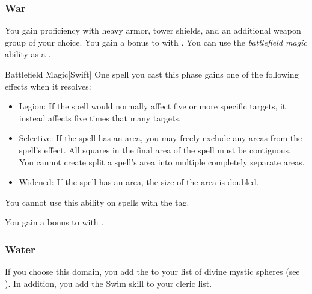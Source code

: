         \subsubsection{War}
             You gain proficiency with heavy armor, tower shields, and an additional weapon group of your choice.
             You gain a  bonus to  with .
             You can use the \textit{battlefield magic} ability as a .
            \begin{apability}{Battlefield Magic}[Swift]
                One spell you cast this phase gains one of the following effects when it resolves:
                \begin{itemize}
                    \item Legion: If the spell would normally affect five or more specific targets, it instead affects five times that many targets.
                    \item Selective: If the spell has an area, you may freely exclude any areas from the spell's effect.
                    All squares in the final area of the spell must be contiguous.
                    You cannot create split a spell's area into multiple completely separate areas.
                    \item Widened: If the spell has an area, the size of the area is doubled.
                \end{itemize}
                You cannot use this ability on spells with the  tag.
            \end{apability}
             You gain a  bonus to  with .

        \subsubsection{Water}
            If you choose this domain, you add the   to your list of divine mystic spheres (see ).
            In addition, you add the Swim skill to your cleric  list.

